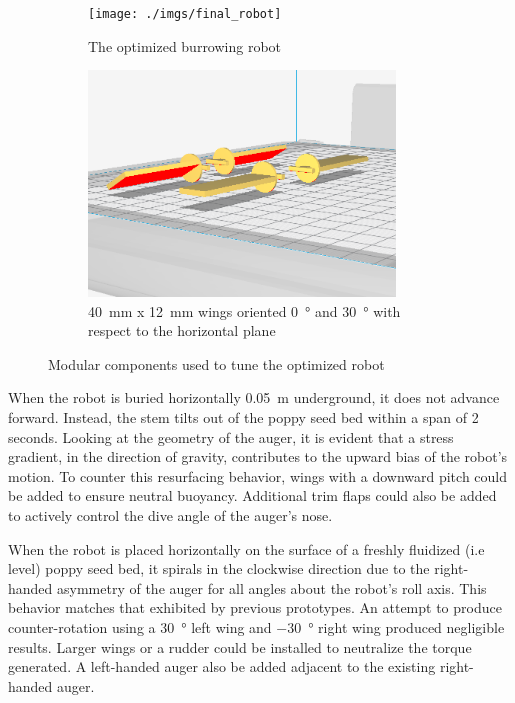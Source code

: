 \documentclass[letterpaper, 11 pt]{article}
\begin{document}
\begin{figure}[H]
\centering
\begin{subfigure}{.5\textwidth}
	\centering
	\texttt{[image: ./imgs/final\_robot]}
	\caption{The optimized burrowing robot}
	\label{fig:final_robot}
\end{subfigure}%
\begin{subfigure}{.5\textwidth}
	\centering
	\includegraphics[height=6cm]{./imgs/wings}
	\caption{\SI{40}{\milli\m} x \SI{12}{\milli\m} wings oriented \SI{0}{\degree} and \SI{30}{\degree} with respect to the horizontal plane}
	\label{fig:wings}
\end{subfigure}
\caption{Modular components used to tune the optimized robot}
\label{fig:final_testing}
\end{figure} 

When the robot is buried horizontally \SI{0.05}{\m} underground, it does not advance forward. Instead, the stem tilts out of the poppy seed bed within a span of 2 seconds. Looking at the geometry of the auger, it is evident that a stress gradient, in the direction of gravity, contributes to the upward bias of the robot's motion. To counter this resurfacing behavior, wings with a downward pitch could be added to ensure neutral buoyancy. Additional trim flaps could also be added to actively control the dive angle of the auger's nose. 
 
When the robot is placed horizontally on the surface of a freshly fluidized (i.e level) poppy seed bed, it spirals in the clockwise direction due to the right-handed asymmetry of the auger for all angles about the robot's roll axis. This behavior matches that exhibited by previous prototypes. An attempt to produce counter-rotation using a \SI{30}{\degree} left wing  and \SI{-30}{\degree} right wing produced negligible results. Larger wings or a rudder could be installed to neutralize the torque generated. A left-handed auger also be added adjacent to the existing right-handed auger. 
 
\end{document}

